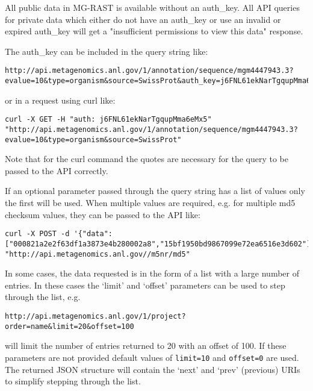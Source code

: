 All public data in MG-RAST is available without an auth\_key. All API queries for private data which either do not have an auth\_key or use an invalid or expired auth\_key will get a "insufficient permissions to view this data" response.

The auth\_key can be included in the query string like:
\begin{small}
\begin{lstlisting}
http://api.metagenomics.anl.gov/1/annotation/sequence/mgm4447943.3?evalue=10&type=organism&source=SwissProt&auth_key=j6FNL61ekNarTgqupMma6eMx5
\end{lstlisting}
\end{small} or in a request using curl like:
\begin{small}
\begin{lstlisting}
curl -X GET -H "auth: j6FNL61ekNarTgqupMma6eMx5" "http://api.metagenomics.anl.gov/1/annotation/sequence/mgm4447943.3?evalue=10&type=organism&source=SwissProt"
\end{lstlisting}
\end{small} Note that for the curl command the quotes are necessary for the query to be passed to the API correctly.

If an optional parameter passed through the query string has a list of values only the first will be used. When multiple values are required, e.g. for multiple md5 checksum values, they can be passed to the API like:
\begin{small}
\begin{lstlisting}
curl -X POST -d '{"data":["000821a2e2f63df1a3873e4b280002a8","15bf1950bd9867099e72ea6516e3d602"]}' "http://api.metagenomics.anl.gov//m5nr/md5"
\end{lstlisting}
\end{small}

In some cases, the data requested is in the form of a list with a large number of entries. In these cases the `limit' and `offset' parameters can be used to step through the list, e.g.
\begin{small}
\begin{lstlisting}
http://api.metagenomics.anl.gov/1/project?order=name&limit=20&offset=100
\end{lstlisting}
\end{small} will limit the number of entries returned to 20 with an offset of 100. If these parameters are not provided default values of \texttt{limit=10} and \texttt{offset=0} are used. The returned JSON structure will contain the `next' and `prev' (previous) URIs to simplify stepping through the list.

